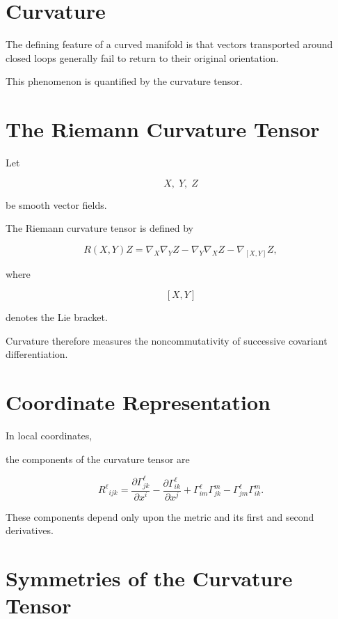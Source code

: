\documentclass[11pt,fleqn]{book}
\numberwithin{equation}{chapter}
\theoremstyle{plain}
\theoremstyle{definition}
\theoremstyle{remark}
\begin{document}

\section{Curvature}

The defining feature of a curved manifold is that vectors transported
around closed loops generally fail to return to their original
orientation.

This phenomenon is quantified by the curvature tensor.


\section{The Riemann Curvature Tensor}

Let

\[
X,\;Y,\;Z
\]

be smooth vector fields.

The Riemann curvature tensor is defined by

\[
\boxed{
R(X,Y)Z
=
\nabla_X\nabla_YZ
-
\nabla_Y\nabla_XZ
-
\nabla_{[X,Y]}Z,
}
\]

where

\[
[X,Y]
\]

denotes the Lie bracket.

Curvature therefore measures the noncommutativity of successive
covariant differentiation.


\section{Coordinate Representation}

In local coordinates,

the components of the curvature tensor are

\[
\boxed{
R^\ell{}_{ijk}
=
\frac{\partial\Gamma^\ell_{jk}}
{\partial x^i}
-
\frac{\partial\Gamma^\ell_{ik}}
{\partial x^j}
+
\Gamma^\ell_{im}\Gamma^m_{jk}
-
\Gamma^\ell_{jm}\Gamma^m_{ik}.
}
\]

These components depend only upon the metric and its first and second
derivatives.


\section{Symmetries of the Curvature Tensor}
\end{document}
